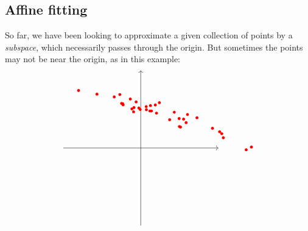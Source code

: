 \documentclass{ximera}
\begin{document}
\subsection*{Affine fitting}

So far, we have been looking to approximate a given collection of
points by a {\em subspace}, which necessarily passes through the
origin. But sometimes the points may not be near the origin, as in
this example:
\begin{equation*}
  \begin{tikzpicture}[baseline=-0.5ex, scale=0.8]
    \draw[thin,->] (-4,0) -- (4,0);
    \draw[thin,->] (0,-4) -- (0,4);
    \fill[color=red] (-0.54,2.53) circle (0.075);
    \fill[color=red] (4.26,0.53) circle (0.075);
    \fill[color=red] (-0.24,2.38) circle (0.075);
    \fill[color=red] (1.98,1.52) circle (0.075);
    \fill[color=red] (0.28,2.14) circle (0.075);
    \fill[color=red] (5.71,0.05) circle (0.075);
    \fill[color=red] (2.90,1.56) circle (0.075);
    \fill[color=red] (-3.21,2.97) circle (0.075);
    \fill[color=red] (5.44,-0.09) circle (0.075);
    \fill[color=red] (-0.37,1.87) circle (0.075);
    \fill[color=red] (-0.46,2.02) circle (0.075);
    \fill[color=red] (2.21,1.49) circle (0.075);
    \fill[color=red] (-0.91,2.23) circle (0.075);
    \fill[color=red] (0.81,1.80) circle (0.075);
    \fill[color=red] (0.47,1.91) circle (0.075);
    \fill[color=red] (0.96,2.34) circle (0.075);
    \fill[color=red] (-0.93,2.29) circle (0.075);
    \fill[color=red] (-0.35,2.09) circle (0.075);
    \fill[color=red] (1.99,1.11) circle (0.075);
    \fill[color=red] (2.34,1.31) circle (0.075);
    \fill[color=red] (-0.99,2.30) circle (0.075);
    \fill[color=red] (-2.26,2.78) circle (0.075);
    \fill[color=red] (4.07,0.84) circle (0.075);
    \fill[color=red] (0.50,2.19) circle (0.075);
    \fill[color=red] (-1.08,2.76) circle (0.075);
    \fill[color=red] (-0.10,2.07) circle (0.075);
    \fill[color=red] (1.49,1.46) circle (0.075);
    \fill[color=red] (2.05,1.08) circle (0.075);
    \fill[color=red] (4.18,0.74) circle (0.075);
    \fill[color=red] (0.29,1.98) circle (0.075);
    \fill[color=red] (-1.37,2.64) circle (0.075);
    \fill[color=red] (0.75,2.22) circle (0.075);
    \fill[color=red] (0.55,1.91) circle (0.075);
    \fill[color=red] (2.41,1.73) circle (0.075);
    \fill[color=red] (3.70,1.02) circle (0.075);
    \fill[color=red] (1.73,1.85) circle (0.075);
    \fill[color=red] (-0.03,1.99) circle (0.075);

\end{tikzpicture}
\end{equation*}
\end{document}
